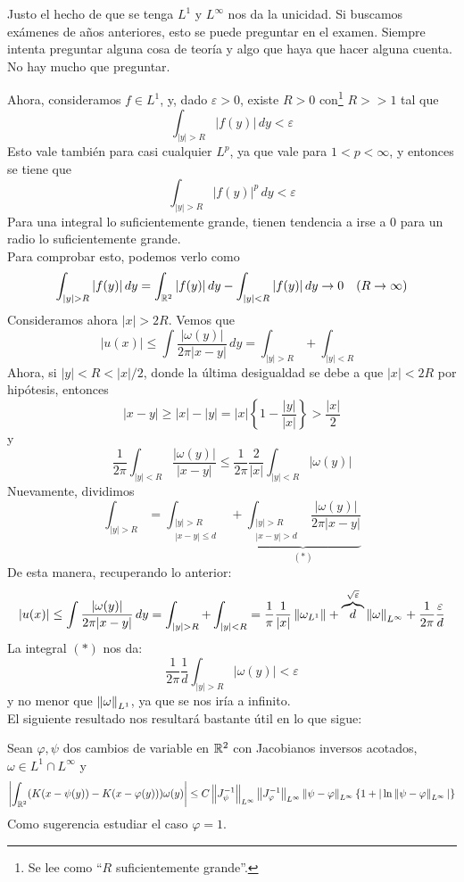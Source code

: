 \begin{observacion}
    Justo el hecho de que se tenga $L^1$ y $L^\infty$ nos da la unicidad. Si buscamos exámenes de años anteriores, esto se puede preguntar en el examen. 
    Siempre intenta preguntar alguna cosa de teoría y algo que haya que hacer alguna cuenta. No hay mucho que preguntar. \\
\end{observacion}

Ahora, consideramos $f \in L^1$, y, dado $\varepsilon > 0$, existe $R > 0$ con\footnote{Se lee como ``$R$ suficientemente grande''.} $R >> 1$
tal que $$\int_{|y| > R} |f(y)|\,dy < \varepsilon$$
Esto vale también para casi cualquier $L^p$, ya que vale para $1 < p < \infty$, y entonces se tiene que
$$\int_{|y| > R} |f(y)|^p\,dy < \varepsilon$$
Para una integral lo suficientemente grande, tienen tendencia a irse a $0$ para un radio lo suficientemente grande. \\

Para comprobar esto, podemos verlo como
$$\int_{|y| > R} |f(y)|\,dy = \int_{\mathbb{R}^2} |f(y)|\,dy - \int_{|y| < R} |f(y)|\,dy \to 0 \quad (R \to \infty)$$
Consideramos ahora $|x| > 2R$. Vemos que 
$$|u(x)| \leq \int \dfrac{|\omega(y)|}{2 \pi |x-y|}\,dy = \int_{|y| > R} + \int_{|y| < R}$$
Ahora, si $|y| < R < |x| / 2$, donde la última desigualdad se debe a que $|x| < 2R$ por hipótesis, entonces
$$|x-y| \geq |x| - |y| = |x| \left\{ 1 - \dfrac{|y|}{|x|} \right\} > \dfrac{|x|}{2}$$
y
$$\dfrac{1}{2 \pi} \int_{|y| < R} \dfrac{|\omega(y)|}{|x-y|} \leq \dfrac{1}{2 \pi} \dfrac{2}{|x|} \int_{|y| < R} |\omega(y)|$$
Nuevamente, dividimos
$$
\int_{|y|>R}
=
\int_{\substack{|y|>R\\|x-y|\leq d}}
+
\underbrace{
\int_{\substack{|y|>R\\|x-y|>d}}
\frac{|\omega(y)|}{2\pi|x-y|}
}_{(*)}
$$
De esta manera, recuperando lo anterior:
$$|u(x)| \leq \int \dfrac{|\omega(y)|}{2 \pi |x-y|}\,dy = \int_{|y| > R} + \int_{|y| < R} = \dfrac{1}{\pi} \dfrac{1}{|x|} \left\lVert \omega_{L^1} \right\rVert + 
\overbrace{d}^{\sqrt{\varepsilon}} \left\lVert \omega \right\rVert_{L^\infty} + \dfrac{1}{2 \pi} \dfrac{\varepsilon}{d}$$
La integral $(*)$ nos da:
$$\dfrac{1}{2 \pi} \dfrac{1}{d} \int_{|y| > R} |\omega(y)| < \varepsilon$$
y no menor que $\left\lVert \omega \right\rVert_{L^1}$, ya que se nos iría a infinito. \\

El siguiente resultado nos resultará bastante útil en lo que sigue:
\begin{lema}
    Sean $\varphi, \psi$ dos cambios de variable en $\mathbb{R}^2$ con Jacobianos inversos acotados, $\omega \in L^1 \cap L^\infty$ y 
    $$\left| \int_{\mathbb{R}^2} (K(x - \psi(y)) - K(x - \varphi(y)))\omega(y) \right| \leq C \left\lVert J_\psi^{-1} \right\rVert_{L^\infty}
    \left\lVert J_\varphi^{-1} \right\rVert_{L^\infty} \left\lVert \psi - \varphi \right\rVert_{L^\infty} \{1 + |\ln \left\lVert \psi - \varphi \right\rVert_{L^\infty}|\}$$
    Como sugerencia estudiar el caso $\varphi = 1$.
\end{lema}

